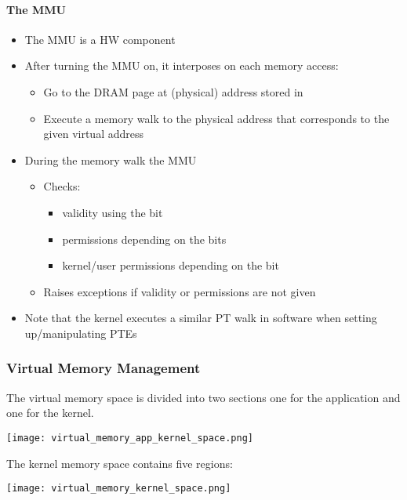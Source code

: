 \paragraph{The MMU}
\begin{itemize}
    \item The MMU is a HW component
    \item After turning the MMU on, it interposes on each memory access:
    \begin{itemize}
        \item Go to the DRAM page at (physical) address stored in 
        \item Execute a memory walk to the physical address that corresponds to the given virtual address
    \end{itemize}
    \item During the memory walk the MMU
    \begin{itemize}
        \item Checks:
        \begin{itemize}
            \item validity using the  bit
            \item permissions depending on the  bits
            \item kernel/user permissions depending on the  bit
        \end{itemize}
        \item Raises exceptions if validity or permissions are not given
    \end{itemize}
    \item Note that the kernel executes a similar PT walk in software when setting up/manipulating PTEs
\end{itemize}

\subsubsection{Virtual Memory Management}
The virtual memory space is divided into two sections one for the application and one for the kernel.
\begin{center}
    \texttt{[image: virtual\_memory\_app\_kernel\_space.png]}
\end{center}

The kernel memory space contains five regions:

\begin{center}
    \texttt{[image: virtual\_memory\_kernel\_space.png]}
\end{center}

